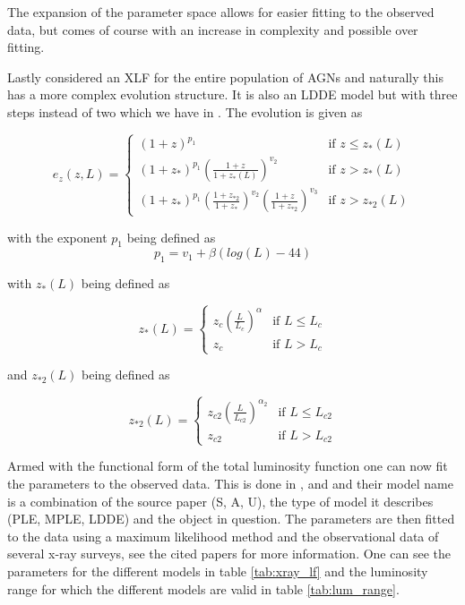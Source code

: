 \documentclass{article}
\begin{document}
 The expansion of the parameter space allows for easier fitting to the observed data, but comes of course with an increase in complexity and possible over fitting. 

 Lastly \cite{Ueda_2014} considered an XLF for the entire population of AGNs and naturally this has a more complex evolution structure. It is also an LDDE model but with three steps instead of two which we have in \cite{Silverman_2008}.
The evolution is given as

 
\begin{equation}
e_z(z, L) = 
\begin{cases} 
(1 + z)^{p_1} & \text{if } z \leq z_*(L) \\
(1 + z_{*})^{p_1} \left( \frac{1 + z}{1 + z_*(L)} \right)^{v_2} & \text{if } z >  z_*(L)\\
(1 + z_{*})^{p_1} (\frac{1 + z_{*2}}{1+ z_{*}})^{v_2} (\frac{1+z}{1+z_{*2}})^{v_3} & \text{if } z >  z_{*2}(L)

\end{cases}
\end{equation}

with the exponent $p_1$ being defined as
\begin{equation}
    p_1 = v_1 + \beta(log(L)-44)
\end{equation}

with $z_{*}(L)$ being defined as

\begin{equation}
z_*(L) = 
\begin{cases} 
z_c \left( \frac{L}{L_c} \right)^\alpha & \text{if } L \leq L_c \\
z_c & \text{if } L > L_c 
\end{cases}
\end{equation}


and $z_{*2}(L)$ being defined as

\begin{equation}
z_{*2}(L) =
\begin{cases}
z_{c2} \left( \frac{L}{L_{c2}} \right)^{\alpha_2} & \text{if } L \leq L_{c2} \\
z_{c2} & \text{if } L > L_{c2}
\end{cases}
\end{equation}



Armed with the functional form of the total luminosity function one can now fit the parameters to the observed data. This is done in \cite{Silverman_2008}, \cite{Ajello_2009} and \cite{Ueda_2014} and their 
model name is a combination of the source paper (S, A, U), the type of model it describes (PLE, MPLE, LDDE) and the object in question. The parameters are then fitted to the data using a maximum likelihood method and the observational data of several x-ray surveys, see the cited papers for more information.
One can see the parameters for the different models in table \ref{tab:xray_lf} and the luminosity range for which the different models are valid in table \ref{tab:lum_range}. 
\end{document}
